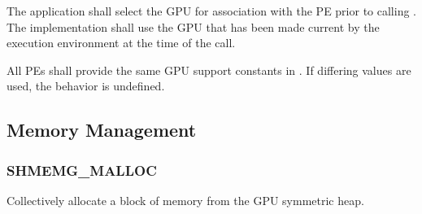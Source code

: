 \begin{apidefinition}
{The application shall select the \ac{GPU} for association with the \ac{PE} prior
to calling . The implementation shall use the \ac{GPU}
that has been made current by the execution environment at the time of the call.

All \acp{PE} shall provide the same GPU support constants in . If
differing values are used, the behavior is undefined.
}


\end{apidefinition}

\subsection{Memory Management}\label{subsec:gpu_memmgmt}

\subsubsection{SHMEMG\_MALLOC}\label{subsec:shmemg_malloc}

Collectively allocate a block of memory from the \ac{GPU} symmetric heap.

